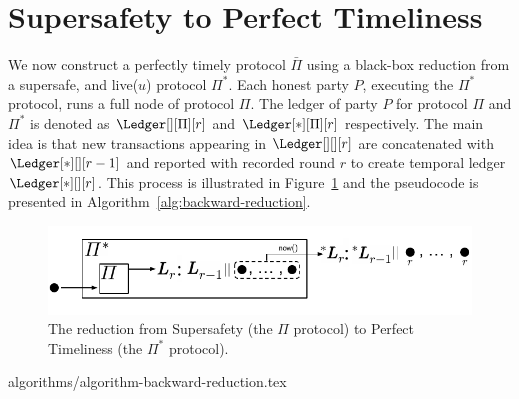 \section{Supersafety to Perfect Timeliness}

We now construct a perfectly timely protocol $\bar\Pi$
using a black-box reduction from a supersafe, and live($u$) protocol $\Pi^*$.
Each honest party $P$, executing the $\Pi^*$ protocol, runs a
full node of protocol $\Pi$.
The ledger of party $P$ for protocol $\Pi$ and $\Pi^*$ is denoted as $\Ledger[][\Pi][r]$ and
$\Ledger[*][\Pi][r]$ respectively.
The main idea is that new transactions appearing in $\Ledger[][][r]$ are
concatenated with $\Ledger[*][][r - 1]$ and reported
with recorded round $r$
to create temporal ledger $\Ledger[*][][r]$.
This process is illustrated
in Figure~\ref{fig:backward-reduction}
and the pseudocode is presented in Algorithm~\ref{alg:backward-reduction}.

\begin{figure}
  \centering
  \includegraphics[width=0.9\columnwidth,keepaspectratio]{figures/backward-reduction.pdf}
  \caption{The reduction from Supersafety
    (the $\Pi$ protocol) to Perfect Timeliness (the $\Pi^*$ protocol).
  }
 \label{fig:backward-reduction}
\end{figure}

{algorithms/algorithm-backward-reduction.tex}

